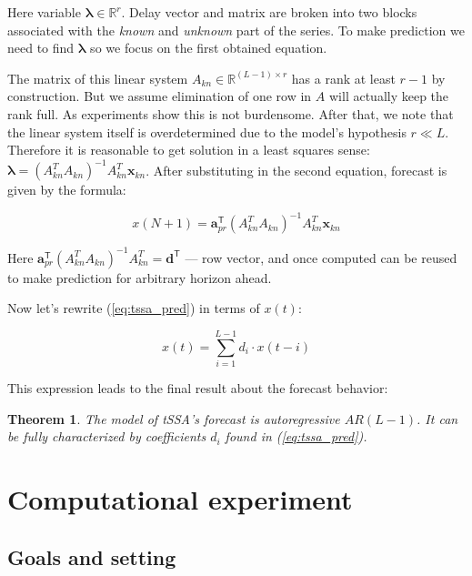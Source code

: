 \documentclass[referee, pdflatex]{sn-jnl}
\theoremstyle{definition}
\theoremstyle{plain}
\newtheorem{Th}{Theorem}
\begin{document}
	Here variable $ \boldsymbol{\lambda} \in \mathbb{R}^r $. Delay vector and matrix are broken into two blocks associated with the \emph{known} and \emph{unknown} part of the series. To make prediction we need to find $ \boldsymbol{\lambda} $ so we focus on the first obtained equation.
	
	The matrix of this linear system $ A_{kn} \in \mathbb{R}^{(L - 1) \times r} $ has a rank at least $ r - 1 $ by construction. But we assume elimination of one row in $ A $ will actually keep the rank full. As experiments show this is not burdensome. After that, we note that the linear system itself is overdetermined due to the model's hypothesis $ r \ll L $. Therefore it is reasonable to get solution in a least squares sense: $ \boldsymbol{\lambda} = (A_{kn}^T A_{kn})^{-1} A_{kn}^T \mathbf{x}_{kn} $. After substituting in the second equation, forecast is given by the formula:
	
	\begin{equation}\label{eq:tssa_pred}
		x(N + 1) = \mathbf{a}_{pr}^{\mathsf{T}} (A_{kn}^T A_{kn})^{-1} A_{kn}^T \mathbf{x}_{kn}
	\end{equation}
	
	Here $ \mathbf{a}_{pr}^{\mathsf{T}} (A_{kn}^T A_{kn})^{-1} A_{kn}^T = \mathbf{d}^{\mathsf{T}} $ --- row vector, and once computed can be reused to make prediction for arbitrary horizon ahead.
	
	Now let's rewrite (\ref{eq:tssa_pred}) in terms of $ x(t) $:
	
	\begin{equation*}\label{eq:autoregr}
		x(t) = \sum\limits_{i = 1}^{L - 1} d_i \cdot x(t - i)
	\end{equation*}
	
	This expression leads to the final result about the forecast behavior:
	
	\begin{Th}		
		The model of tSSA's forecast is \emph{autoregressive} $ AR(L - 1) $. It can be fully characterized by coefficients $ d_i $ found in (\ref{eq:tssa_pred}).
	\end{Th}
	
	\section{Computational experiment}	
	
	\subsection{Goals and setting}
	
\end{document}
